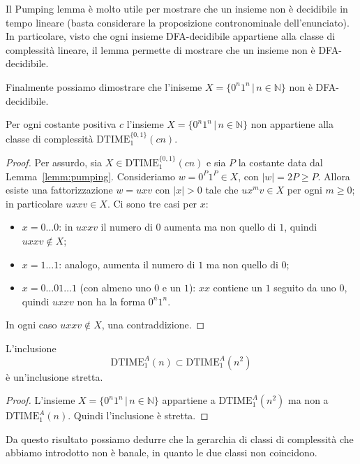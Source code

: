 \begin{rema}
    Il Pumping lemma è molto utile per mostrare che un insieme non è decidibile in tempo lineare (basta considerare la proposizione contronominale dell'enunciato).
    In particolare, visto che ogni insieme DFA-decidibile appartiene alla classe di complessità lineare, il lemma permette di mostrare che un insieme non è DFA-decidibile.
\end{rema}
Finalmente possiamo dimostrare che l'iniseme 
$X=\{ 0^n1^n \, | \, n \in \mathbb N\}$
non è DFA-decidibile.
\begin{prop}
\label{0n1n non compl lineare}
Per ogni costante positiva $c$ l'insieme $X=\{ 0^n1^n \, | \, n \in \mathbb N\}$
non appartiene alla classe di complessità $\text{DTIME}_1^{\{0,1\}}(cn)$.
\begin{proof}
Per assurdo, sia $X\in\text{DTIME}_1^{\{0,1\}}(cn)$ e sia $P$ la costante data dal Lemma~\ref{lemm:pumping}. Consideriamo $w=0^P1^P\in X$, con $|w|=2P\ge P$. Allora esiste una fattorizzazione $w=uxv$ con $|x|>0$ tale che $ux^mv\in X$ per ogni $m\ge 0$; in particolare $uxxv\in X$. Ci sono tre casi per $x$:
\begin{itemize}
    \item $x = 0\dots 0$: in $uxxv$ il numero di $0$ aumenta ma non quello di $1$, quindi $uxxv\notin X$;
    \item $x = 1\dots 1$: analogo, aumenta il numero di $1$ ma non quello di $0$;
    \item $x = 0\dots 01\dots 1$ (con almeno uno $0$ e un $1$): $xx$ contiene un $1$ seguito da uno $0$, quindi $uxxv$ non ha la forma $0^n1^n$.
\end{itemize}
In ogni caso $uxxv\notin X$, una contraddizione.
\end{proof}
\end{prop}

    \begin{coro}
L'inclusione
$$
\text{DTIME}_1^A(n) \subset \text{DTIME}_1^A(n^2)
$$
è un'inclusione stretta.
\begin{proof}
    L'insieme 
    $X=\{ 0^n1^n \, | \, n \in \mathbb N\}$
    appartiene a $\text{DTIME}_1^A(n^2)$ ma non a 
    $\text{DTIME}_1^A(n)$.
    Quindi l'inclusione è stretta.
\end{proof}
\end{coro}
Da questo risultato possiamo dedurre che la gerarchia di classi di complessità che abbiamo introdotto non è banale, in quanto le due classi non coincidono.
